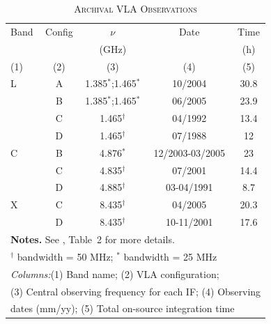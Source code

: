\documentclass[fleqn,usenatbib]{mnras}
\def\tab{Table}
\begin{document}
\begin{center}
\begin{table}\footnotesize
\caption{\textsc{Archival VLA Observations}}
\label{tab:vlaObs}
\hfill{}
\tabcolsep=0.11cm
\begin{tabular}{lcccc}
\hline\hline
\noalign{\smallskip}
Band & Config & $\nu$ &    Date     & Time \\ 
     &               & (GHz) &   & (h) \\ 
(1)  &      (2)      & (3)   &   (4)       &  (5)   \\ 
 \hline 
L & A & 1.385$^{*}$;1.465$^{*}$ & 10/2004 & 30.8 \\
  & B & 1.385$^{*}$;1.465$^{*}$ & 06/2005   & 23.9 \\
  & C & 1.465$^{\dagger}$ & 04/1992  & 13.4 \\
  & D & 1.465$^{\dagger}$ & 07/1988 & 12 \\
\hline
C & B & 4.876$^{*}$ & 12/2003-03/2005 & 23 \\
  & C & 4.835$^{\dagger}$ & 07/2001 & 14.4 \\
  & D & 4.885$^{\dagger}$ & 03-04/1991 & 8.7 \\
\hline
X & C & 8.435$^{\dagger}$ & 04/2005 & 20.3 \\
  & D & 8.435$^{\dagger}$ & 10-11/2001 & 17.6 \\
\hline
\hline
\multicolumn{5}{l}{\textbf{Notes.} See \citealt{Dumasetal2011}, \tab~2 for more details. }\\
\multicolumn{5}{l}{$^{\dagger}$ bandwidth = 50 MHz; $^{*}$ bandwidth = 25 MHz }\\
\multicolumn{5}{l}{\textit{Columns:}(1) Band name; (2) VLA configuration; }\\
\multicolumn{5}{l}{(3) Central observing frequency for each IF; (4) Observing}\\
\multicolumn{5}{l}{dates (mm/yy); (5) Total on-source integration time}

\end{tabular}
\hfill{}
\end{table}
\end{center}
\end{document}
